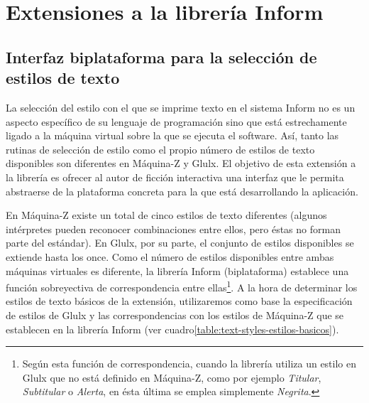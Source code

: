 
\chapter{Extensiones a la librería Inform}\label{ch:extensiones}

\section{Interfaz biplataforma para la selección de estilos de texto}\label{sec:textStyles}

La selección del estilo con el que se imprime texto en el sistema Inform no es un aspecto específico de su lenguaje de programación sino que está estrechamente ligado a la máquina virtual sobre la que se ejecuta el software. Así, tanto las rutinas de selección de estilo como el propio número de estilos de texto disponibles son diferentes en Máquina-Z y Glulx. El objetivo de esta extensión a la librería es ofrecer al autor de ficción interactiva una interfaz que le permita abstraerse de la plataforma concreta para la que está desarrollando la aplicación.

En Máquina-Z existe un total de cinco estilos de texto diferentes (algunos intérpretes pueden reconocer combinaciones entre ellos, pero éstas no forman parte del estándar)\cite{Nelson:Fillmore:2014}. En Glulx, por su parte, el conjunto de estilos disponibles se extiende hasta los once\cite{Plotkin:2017:a}. Como el número de estilos disponibles entre ambas máquinas virtuales es diferente, la librería Inform (biplataforma) establece una función sobreyectiva de correspondencia entre ellas\footnote{Según esta función de correspondencia, cuando la librería utiliza un estilo en Glulx que no está definido en Máquina-Z, como por ejemplo \emph{Titular}, \emph{Subtitular} o \emph{Alerta}, en ésta última se emplea simplemente \emph{Negrita}.}. A la hora de determinar los estilos de texto básicos de la extensión, utilizaremos como base la especificación de estilos de Glulx y las correspondencias con los estilos de Máquina-Z que se establecen en la librería Inform (ver cuadro\ref{table:text-styles-estilos-basicos}).

